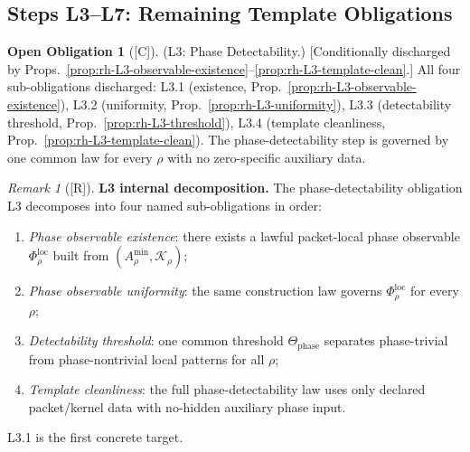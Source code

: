 \documentclass[12pt,oneside]{amsbook}
\theoremstyle{plain}
\theoremstyle{definition}
\newtheorem{obligation}[theorem]{Open Obligation}
\theoremstyle{remark}
\newtheorem{remark}[theorem]{Remark}
\newcommand{\status}[1]{\textup{[#1]}}
\begin{document}
\subsection{Steps L3--L7: Remaining Template Obligations}

\begin{obligation}[\status{C}]\label{ob:rh-tloc-L3}
\textup{(L3: Phase Detectability.)}
\textup{[Conditionally discharged by
Props.~\ref{prop:rh-L3-observable-existence}--\ref{prop:rh-L3-template-clean}.]}
All four sub-obligations discharged:
L3.1 (existence, Prop.~\ref{prop:rh-L3-observable-existence}),
L3.2 (uniformity, Prop.~\ref{prop:rh-L3-uniformity}),
L3.3 (detectability threshold, Prop.~\ref{prop:rh-L3-threshold}),
L3.4 (template cleanliness, Prop.~\ref{prop:rh-L3-template-clean}).
The phase-detectability step is governed by one common law for every
$\rho$ with no zero-specific auxiliary data.
\end{obligation}

\begin{remark}[\status{R}]\label{rem:rh-L3-structure}
\textbf{L3 internal decomposition.}
The phase-detectability obligation L3 decomposes into four
named sub-obligations in order:
\begin{enumerate}[label=\textup{(L3.\arabic*)}]
 \item \emph{Phase observable existence}: there exists a lawful
 packet-local phase observable $\Phi_\rho^{\mathrm{loc}}$
 built from $(A_\rho^{\min}, \mathcal{K}_\rho)$;
 \item \emph{Phase observable uniformity}: the same construction
 law governs $\Phi_\rho^{\mathrm{loc}}$ for every $\rho$;
 \item \emph{Detectability threshold}: one common
 threshold $\Theta_{\mathrm{phase}}$ separates phase-trivial
 from phase-nontrivial local patterns for all $\rho$;
 \item \emph{Template cleanliness}: the full phase-detectability
 law uses only declared packet/kernel data with no-hidden
 auxiliary phase input.
\end{enumerate}
L3.1 is the first concrete target.
\end{remark}
\end{document}
